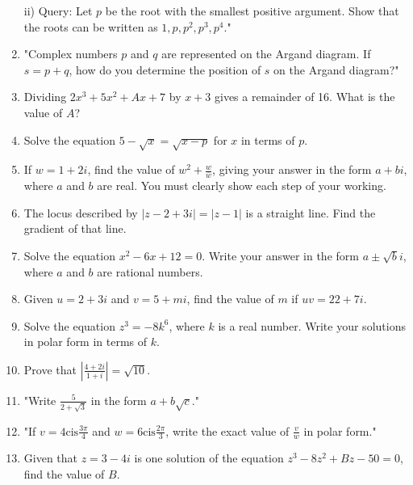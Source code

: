 \documentclass{article}
\begin{document}
\begin{enumerate}
ii) Query: Let \( p \) be the root with the smallest positive argument. Show that the roots can be written as \( 1, p, p^2, p^3, p^4 \)."
\vspace{3cm}
\item "Complex numbers \( p \) and \( q \) are represented on the Argand diagram. If \( s = p + q \), how do you determine the position of \( s \) on the Argand diagram?"
\vspace{3cm}
\item Dividing \( 2x^3 + 5x^2 + Ax + 7 \) by \( x + 3 \) gives a remainder of 16. What is the value of \( A \)?
\vspace{3cm}
\item Solve the equation \( 5 - \sqrt{x} = \sqrt{x - p} \) for \( x \) in terms of \( p \).
\vspace{3cm}
\item If \( w = 1 + 2i \), find the value of \( w^2 + \frac{w}{\overline{w}} \), giving your answer in the form \( a + bi \), where \( a \) and \( b \) are real. You must clearly show each step of your working.
\vspace{3cm}
\item The locus described by \( |z - 2 + 3i| = |z - 1| \) is a straight line. Find the gradient of that line.
\vspace{3cm}
\item Solve the equation \(x^2 - 6x + 12 = 0\). Write your answer in the form \(a \pm \sqrt{b}i\), where \(a\) and \(b\) are rational numbers.
\vspace{3cm}
\item Given \( u = 2 + 3i \) and \( v = 5 + mi \), find the value of \( m \) if \( uv = 22 + 7i \).
\vspace{3cm}
\item Solve the equation \(z^3 = -8k^6\), where \(k\) is a real number. Write your solutions in polar form in terms of \(k\).
\vspace{3cm}
\item Prove that \(\left| \frac{4 + 2i}{1 + i} \right| = \sqrt{10}\).
\vspace{3cm}
\item "Write \( \frac{5}{2+\sqrt{3}} \) in the form \( a + b\sqrt{c} \)."
\vspace{3cm}
\item "If \( v = 4 \text{cis} \frac{3\pi}{4} \) and \( w = 6 \text{cis} \frac{2\pi}{3} \), write the exact value of \( \frac{v}{w} \) in polar form."
\vspace{3cm}
\item Given that \( z = 3 - 4i \) is one solution of the equation \( z^3 - 8z^2 + Bz - 50 = 0 \), find the value of \( B \).

\end{enumerate}
\end{document}
